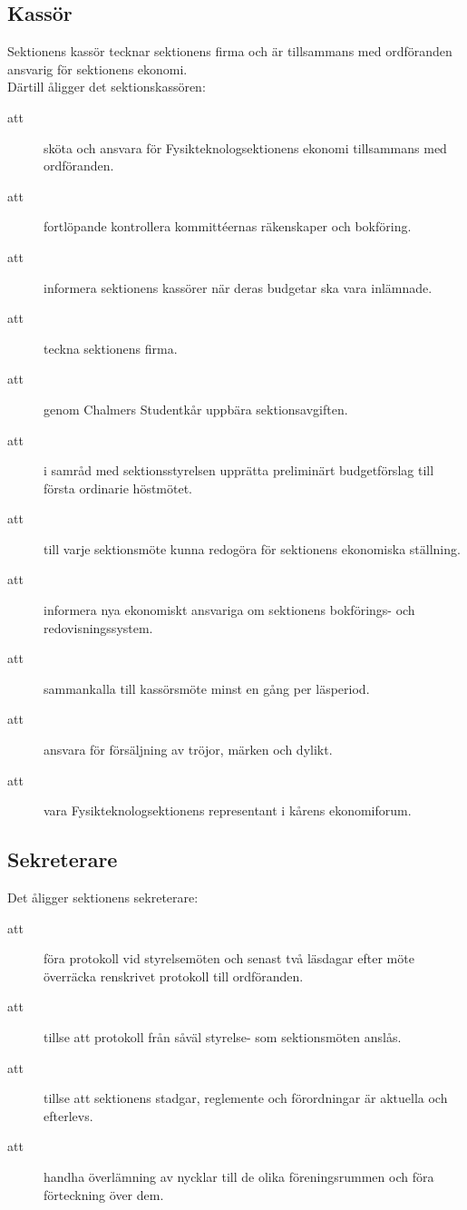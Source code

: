 \documentclass[a4paper]{article}
\begin{document}
\begin{foreningenv}{\forening{}}
    \subsection{Kassör}
    Sektionens kassör tecknar sektionens firma och är tillsammans med ordföranden ansvarig för sektionens ekonomi. \\
    Därtill åligger det sektionskassören:
    \begin{description}
        \item[att] sköta och ansvara för Fysikteknologsektionens ekonomi tillsammans med ordföranden.
        \item[att] fortlöpande kontrollera kommittéernas räkenskaper och bokföring.
        \item[att] informera sektionens kassörer när deras budgetar ska vara inlämnade. %
        \item[att] teckna sektionens firma.
        \item[att] genom Chalmers Studentkår uppbära sektionsavgiften.
        \item[att] i samråd med sektionsstyrelsen upprätta preliminärt budgetförslag till första ordinarie höstmötet.
        \item[att] till varje sektionsmöte kunna redogöra för sektionens ekonomiska ställning. 
        \item[att] informera nya ekonomiskt ansvariga om sektionens bokförings- och redovisningssystem.
        \item[att] sammankalla till kassörsmöte minst en gång per läsperiod.
        \item[att] ansvara för försäljning av tröjor, märken och dylikt.
        \item[att] vara Fysikteknologsektionens representant i kårens ekonomiforum. 
    \end{description}
    
    \subsection{Sekreterare}
    Det åligger sektionens sekreterare:
    \begin{description}
        \item[att] föra protokoll vid styrelsemöten och senast två läsdagar efter möte överräcka renskrivet protokoll till ordföranden.
        \item[att] tillse att protokoll från såväl styrelse- som sektionsmöten anslås.
        \item[att] tillse att sektionens stadgar, reglemente och förordningar är aktuella och efterlevs.
        \item[att] handha överlämning av nycklar till de olika föreningsrummen och föra förteckning över dem.
    \end{description}
    

\end{foreningenv}
\end{document}
